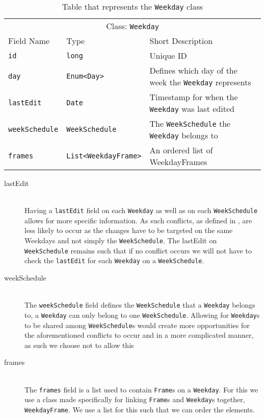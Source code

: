 \begin{table}[]
\centering
\caption{Table that represents the \texttt{Weekday} class}
\label{tbl:Weekday}
\begin{tabular}{lll}
\multicolumn{3}{c}{Class: \texttt{Weekday}}                                                                                    \\
Field Name            & Type                                            & Short Description                                    \\
\texttt{id}           & \texttt{long}                                   & Unique ID                                            \\
\texttt{day}          & \texttt{Enum\textless Day\textgreater}          & Defines which day of the week the \texttt{Weekday} represents \\
\texttt{lastEdit}     & \texttt{Date}                                   & Timestamp for when the \texttt{Weekday} was last edited       \\
\texttt{weekSchedule} & \texttt{WeekSchedule}                           & The \texttt{WeekSchedule} the \texttt{Weekday} belongs to     \\
\texttt{frames}       & \texttt{List\textless WeekdayFrame\textgreater} & An ordered list of WeekdayFrames 
\end{tabular}
\end{table}

\begin{description}
    \item [lastEdit] \hfill \\
    Having a \texttt{lastEdit} field on each \texttt{Weekday} as well as on each \texttt{WeekSchedule} allows for more specific information. 
    As such conflicts, as defined in , are less likely to occur as the changes have to be targeted on the same Weekdays and not simply the \texttt{WeekSchedule}. 
    The lastEdit on \texttt{WeekSchedule} remains such that if no conflict occurs we will not have to check the \texttt{lastEdit} for each \texttt{Weekday} on a \texttt{WeekSchedule}.
    \item [weekSchedule] \hfill \\
    The \texttt{weekSchedule} field defines the \texttt{WeekSchedule} that a \texttt{Weekday} belongs to, a \texttt{Weekday} can only belong to one \texttt{WeekSchedule}.
    Allowing for \texttt{Weekday}s to be shared among \texttt{WeekSchedule}s would create more opportunities for the aforementioned conflicts to occur and in a more complicated manner, as such we choose not to allow this
    \item [frames] \hfill \\
    The \texttt{frames} field is a list used to contain \texttt{Frame}s on a \texttt{Weekday}.
    For this we use a class made specifically for linking \texttt{Frame}s and \texttt{Weekday}s together, \texttt{WeekdayFrame}.
    We use a list for this such that we can order the elements.
\end{description}

